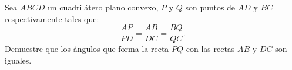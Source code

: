 Sea $ABCD$ un cuadrilátero plano convexo, $P$ y $Q$ son puntos de $AD$ y $BC$ respectivamente tales que: 
\[\frac{AP}{PD}=\frac{AB}{DC}=\frac{BQ}{QC}.\] 
Demuestre que los ángulos que forma la recta $PQ$ con las rectas $AB$ y $DC$ son iguales.
